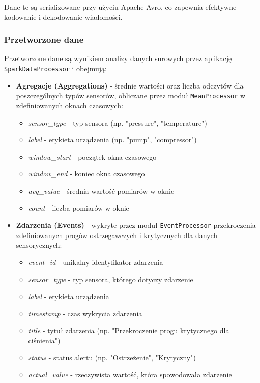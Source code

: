 Dane te są serializowane przy użyciu Apache Avro, co zapewnia efektywne kodowanie i dekodowanie wiadomości.

\subsubsection{Przetworzone dane}
\label{subsubsec:przetworzone_dane}

Przetworzone dane są wynikiem analizy danych surowych przez aplikację \texttt{SparkDataProcessor} i obejmują:

\begin{itemize}
    \item \textbf{Agregacje (Aggregations)} - średnie wartości oraz liczba odczytów dla poszczególnych typów sensorów, obliczane przez moduł \texttt{MeanProcessor} w zdefiniowanych oknach czasowych:
    \begin{itemize}
        \item \textit{sensor_type} - typ sensora (np. "pressure", "temperature")
        \item \textit{label} - etykieta urządzenia (np. "pump", "compressor")
        \item \textit{window_start} - początek okna czasowego
        \item \textit{window_end} - koniec okna czasowego
        \item \textit{avg_value} - średnia wartość pomiarów w oknie
        \item \textit{count} - liczba pomiarów w oknie
    \end{itemize}
    
    \item \textbf{Zdarzenia (Events)} - wykryte przez moduł \texttt{EventProcessor} przekroczenia zdefiniowanych progów ostrzegawczych i krytycznych dla danych sensorycznych:
    \begin{itemize}
        \item \textit{event_id} - unikalny identyfikator zdarzenia
        \item \textit{sensor_type} - typ sensora, którego dotyczy zdarzenie
        \item \textit{label} - etykieta urządzenia
        \item \textit{timestamp} - czas wykrycia zdarzenia
        \item \textit{title} - tytuł zdarzenia (np. "Przekroczenie progu krytycznego dla ciśnienia")
        \item \textit{status} - status alertu (np. "Ostrzeżenie", "Krytyczny")
        \item \textit{actual_value} - rzeczywista wartość, która spowodowała zdarzenie
    \end{itemize}
    

\end{itemize}
